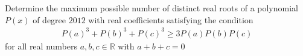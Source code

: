 Determine the maximum possible number of distinct real roots of a polynomial $P(x)$ of degree $2012$ with real coefficients satisfying the condition
\begin{align*}  P(a)^3 + P(b)^3 + P(c)^3 \geq 3 P(a) P(b) P(c) \end{align*}for all real numbers $a,b,c \in \mathbb{R}$ with $a+b+c=0$